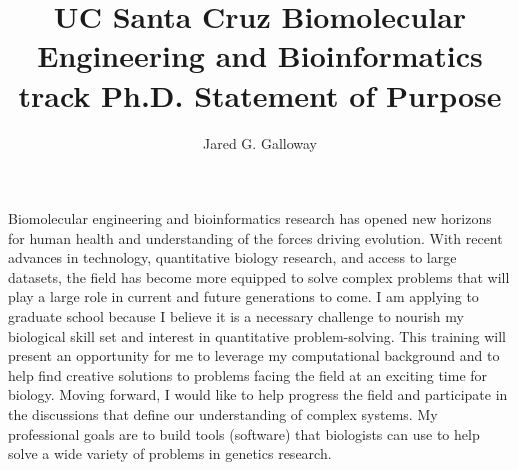 \documentclass[11pt]{amsart}
\title{UC Santa Cruz Biomolecular Engineering and Bioinformatics track Ph.D. Statement of Purpose}
\author{Jared G. Galloway}
\newcommand{\sepspace}{\vspace*{1em}}		%
\begin{document}
\maketitle


Biomolecular engineering and bioinformatics research has opened new horizons for human health and understanding of the forces driving evolution.
With recent advances in technology, quantitative biology research, and access to large datasets, 
the field has become more equipped to solve complex problems that will play a large role in current and future generations to come.
I am applying to graduate school because I believe it is a necessary challenge to nourish my biological skill set and interest in quantitative problem-solving. 
This training will present an opportunity for me to leverage my computational background and to help find creative solutions to problems facing the field at an exciting time for biology.
Moving forward, I would like to help progress the field and participate in the discussions that define our understanding of complex systems.
My professional goals are to build tools (software) that biologists can use to help solve a wide variety of problems in genetics research.
\sepspace
\end{document}
